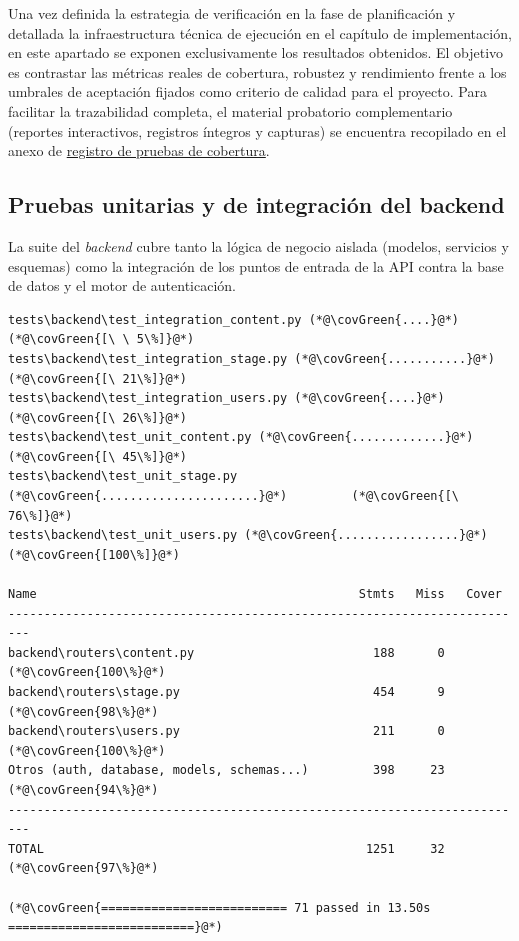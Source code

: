 Una vez definida la estrategia de verificación en la fase de planificación y detallada la infraestructura técnica de ejecución en el capítulo de implementación, en este apartado se exponen exclusivamente los resultados obtenidos. El objetivo es contrastar las métricas reales de cobertura, robustez y rendimiento frente a los umbrales de aceptación fijados como criterio de calidad para el proyecto. Para facilitar la trazabilidad completa, el material probatorio complementario (reportes interactivos, registros íntegros y capturas) se encuentra recopilado en el anexo de \hyperref[anexo:registro_pruebas_cobertura]{registro de pruebas de cobertura}.

\subsection{Pruebas unitarias y de integración del backend}\label{sub:resultados_pruebas_backend}

La suite del \textit{backend} cubre tanto la lógica de negocio aislada (modelos, servicios y esquemas) como la integración de los puntos de entrada de la API contra la base de datos y el motor de autenticación. 

\begin{evidence}[H]
\begin{lstlisting}
tests\backend\test_integration_content.py (*@\covGreen{....}@*)                  (*@\covGreen{[\ \ 5\%]}@*)
tests\backend\test_integration_stage.py (*@\covGreen{...........}@*)             (*@\covGreen{[\ 21\%]}@*)
tests\backend\test_integration_users.py (*@\covGreen{....}@*)                    (*@\covGreen{[\ 26\%]}@*)
tests\backend\test_unit_content.py (*@\covGreen{.............}@*)                (*@\covGreen{[\ 45\%]}@*)
tests\backend\test_unit_stage.py (*@\covGreen{......................}@*)         (*@\covGreen{[\ 76\%]}@*)
tests\backend\test_unit_users.py (*@\covGreen{.................}@*)              (*@\covGreen{[100\%]}@*)

Name                                             Stmts   Miss   Cover
-------------------------------------------------------------------------
backend\routers\content.py                         188      0  (*@\covGreen{100\%}@*)
backend\routers\stage.py                           454      9   (*@\covGreen{98\%}@*)
backend\routers\users.py                           211      0  (*@\covGreen{100\%}@*)
Otros (auth, database, models, schemas...)         398     23   (*@\covGreen{94\%}@*)
-------------------------------------------------------------------------
TOTAL                                             1251     32   (*@\covGreen{97\%}@*)

(*@\covGreen{========================== 71 passed in 13.50s ==========================}@*)
\end{lstlisting}
\caption{Resumen de ejecución y cobertura en backend.}
\label{ev:resumen_backend}
\end{evidence}

